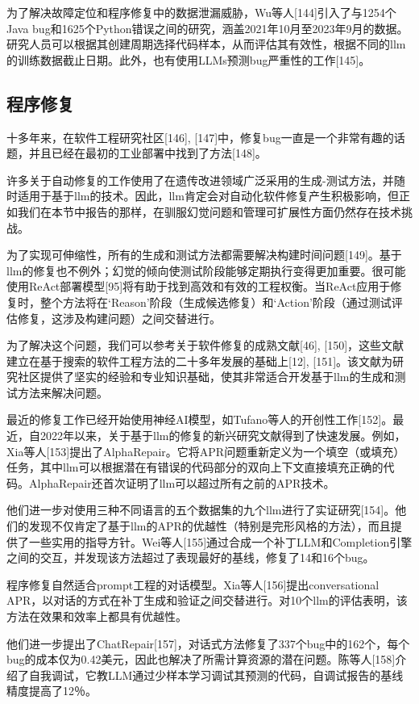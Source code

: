 \begin{translation}
为了解决故障定位和程序修复中的数据泄漏威胁，Wu等人[144]引入了与1254个Java bug和1625个Python错误之间的研究，涵盖2021年10月至2023年9月的数据。研究人员可以根据其创建周期选择代码样本，从而评估其有效性，根据不同的llm的训练数据截止日期。此外，也有使用LLMs预测bug严重性的工作[145]。

\subsection{程序修复}

十多年来，在软件工程研究社区[146], [147]中，修复bug一直是一个非常有趣的话题，并且已经在最初的工业部署中找到了方法[148]。

许多关于自动修复的工作使用了在遗传改进领域广泛采用的生成-测试方法，并随时适用于基于llm的技术。因此，llm肯定会对自动化软件修复产生积极影响，但正如我们在本节中报告的那样，在驯服幻觉问题和管理可扩展性方面仍然存在技术挑战。

为了实现可伸缩性，所有的生成和测试方法都需要解决构建时间问题[149]。基于llm的修复也不例外；幻觉的倾向使测试阶段能够定期执行变得更加重要。很可能使用ReAct部署模型[95]将有助于找到高效和有效的工程权衡。当ReAct应用于修复时，整个方法将在‘Reason’阶段（生成候选修复）和‘Action’阶段（通过测试评估修复，这涉及构建问题）之间交替进行。

为了解决这个问题，我们可以参考关于软件修复的成熟文献[46], [150]，这些文献建立在基于搜索的软件工程方法的二十多年发展的基础上[12], [151]。该文献为研究社区提供了坚实的经验和专业知识基础，使其非常适合开发基于llm的生成和测试方法来解决问题。

最近的修复工作已经开始使用神经AI模型，如Tufano等人的开创性工作[152]。最近，自2022年以来，关于基于llm的修复的新兴研究文献得到了快速发展。例如，Xia等人[153]提出了AlphaRepair。它将APR问题重新定义为一个填空（或填充）任务，其中llm可以根据潜在有错误的代码部分的双向上下文直接填充正确的代码。AlphaRepair还首次证明了llm可以超过所有之前的APR技术。

他们进一步对使用三种不同语言的五个数据集的九个llm进行了实证研究[154]。他们的发现不仅肯定了基于llm的APR的优越性（特别是完形风格的方法），而且提供了一些实用的指导方针。Wei等人[155]通过合成一个补丁LLM和Completion引擎之间的交互，并发现该方法超过了表现最好的基线，修复了14和16个bug。

程序修复自然适合prompt工程的对话模型。Xia等人[156]提出conversational APR，以对话的方式在补丁生成和验证之间交替进行。对10个llm的评估表明，该方法在效果和效率上都具有优越性。

他们进一步提出了ChatRepair[157]，对话式方法修复了337个bug中的162个，每个bug的成本仅为0.42美元，因此也解决了所需计算资源的潜在问题。陈等人[158]介绍了自我调试，它教LLM通过少样本学习调试其预测的代码，自调试报告的基线精度提高了12％。


\end{translation}
